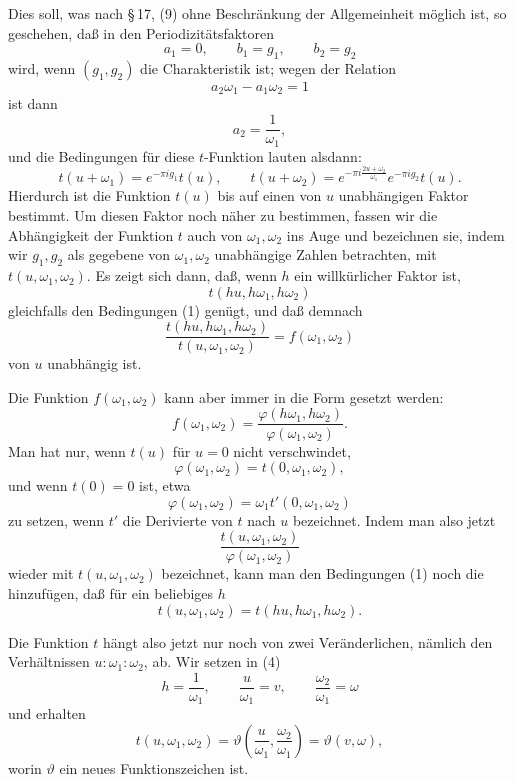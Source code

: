 \documentclass[11pt]{article}
\begin{document}
Dies soll, was nach \S\,17, (9) ohne Beschränkung der Allgemeinheit möglich ist, so geschehen, daß in den Periodizitätsfaktoren
\[
a_1=0,\qquad b_1=g_1,\qquad b_2=g_2
\]
wird, wenn $(g_1,g_2)$ die Charakteristik ist; wegen der Relation
\[
a_2\omega_1-a_1\omega_2=1
\]
ist dann
\[
a_2=\frac{1}{\omega_1},
\]
und die Bedingungen für diese $t$-Funktion lauten alsdann:
\begin{equation}
t(u+\omega_1)=e^{-\pi i g_1}t(u),\qquad
t(u+\omega_2)=e^{-\pi i\frac{2u+\omega_2}{\omega_1}}e^{-\pi i g_2}t(u).
\tag{1}
\end{equation}
Hierdurch ist die Funktion $t(u)$ bis auf einen von $u$ unabhängigen Faktor bestimmt. Um diesen Faktor noch näher zu bestimmen, fassen wir die Abhängigkeit der Funktion $t$ auch von $\omega_1,\omega_2$ ins Auge und bezeichnen sie, indem wir $g_1,g_2$ als gegebene von $\omega_1,\omega_2$ unabhängige Zahlen betrachten, mit $t(u,\omega_1,\omega_2)$. Es zeigt sich dann, daß, wenn $h$ ein willkürlicher Faktor ist,
\[
t(hu,h\omega_1,h\omega_2)
\]
gleichfalls den Bedingungen (1) genügt, und daß demnach
\begin{equation}
\frac{t(hu,h\omega_1,h\omega_2)}{t(u,\omega_1,\omega_2)}=f(\omega_1,\omega_2)
\tag{2}
\end{equation}
von $u$ unabhängig ist.

Die Funktion $f(\omega_1,\omega_2)$ kann aber immer in die Form gesetzt werden:
\[
f(\omega_1,\omega_2)=\frac{\varphi(h\omega_1,h\omega_2)}{\varphi(\omega_1,\omega_2)}.
\]
Man hat nur, wenn $t(u)$ für $u=0$ nicht verschwindet,
\[
\varphi(\omega_1,\omega_2)=t(0,\omega_1,\omega_2),
\]
und wenn $t(0)=0$ ist, etwa
\[
\varphi(\omega_1,\omega_2)=\omega_1t'(0,\omega_1,\omega_2)
\]
zu setzen, wenn $t'$ die Derivierte von $t$ nach $u$ bezeichnet. Indem man also jetzt
\begin{equation}
\frac{t(u,\omega_1,\omega_2)}{\varphi(\omega_1,\omega_2)}
\tag{3}
\end{equation}
wieder mit $t(u,\omega_1,\omega_2)$ bezeichnet, kann man den Bedingungen (1) noch die hinzufügen, daß für ein beliebiges $h$
\begin{equation}
t(u,\omega_1,\omega_2)=t(hu,h\omega_1,h\omega_2).
\tag{4}
\end{equation}

Die Funktion $t$ hängt also jetzt nur noch von zwei Veränderlichen, nämlich den Verhältnissen $u:\omega_1:\omega_2$, ab. Wir setzen in (4)
\[
h=\frac1{\omega_1},\qquad \frac{u}{\omega_1}=v,\qquad \frac{\omega_2}{\omega_1}=\omega
\]
und erhalten
\begin{equation}
t(u,\omega_1,\omega_2)=\vartheta\!\left(\frac{u}{\omega_1},\frac{\omega_2}{\omega_1}\right)=\vartheta(v,\omega),
\tag{5}
\end{equation}
worin $\vartheta$ ein neues Funktionszeichen ist.
\end{document}
